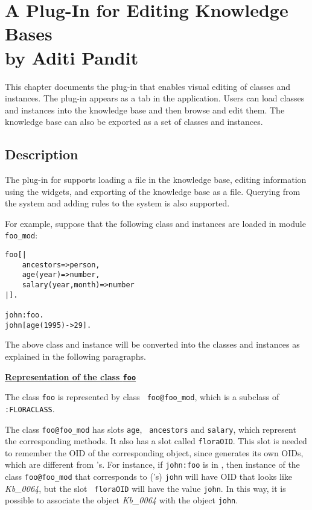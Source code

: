 

\chapter[A \Protege Plug-In for Editing  \FLSYSTEM Knowledge Bases]{A \Protege Plug-In for Editing  \FLSYSTEM Knowledge Bases\\
      {\Large by Aditi Pandit}}

    This chapter documents the \Protege plug-in that enables visual editing of
    \FLSYSTEM classes and instances. The plug-in appears as a tab in the \Protege
    application. Users can load \FLSYSTEM classes and
    instances into the \Protege knowledge base and then browse and edit them.
    The \Protege knowledge base can also be exported as a set of
    \fl classes and instances.

\section{Description}

The \Protege plug-in for \FLSYSTEM supports loading a \FLSYSTEM file in
the \Protege knowledge base, editing information using the \Protege
widgets, and exporting of the \Protege knowledge base as a \FLSYSTEM
file. Querying from the \Protege system and adding rules to the
\FLSYSTEM system is also supported.

For example, suppose that the following \FLSYSTEM class and instances
are loaded in module {\tt foo\_mod}:

\begin{verbatim}
foo[|
    ancestors=>person,
    age(year)=>number,
    salary(year,month)=>number
|].

john:foo.
john[age(1995)->29].
\end{verbatim}

The above \FLSYSTEM class and instance will be converted into the
\Protege classes and instances as explained in the following
paragraphs.

\underline{{\bf Representation of the class {\tt foo}}}

 The \fl class {\tt foo} is represented by \Protege class {\tt
foo@foo\_mod}, which is a subclass of {\tt :FLORACLASS}.

The \Protege class {\tt foo@foo\_mod} has slots {\tt age}, {\tt
  ancestors} and {\tt salary}, which represent the corresponding \fl
methods. It also has a slot called {\tt floraOID}. This slot is
needed to remember the OID of the corresponding \FLSYSTEM object, since
\Protege generates its own OIDs, which are different from \FLSYSTEM's.
For instance, if {\tt john:foo} is in \FLSYSTEM, then \Protege instance
of the \Protege class {\tt foo@foo\_mod} that corresponds to
(\FLSYSTEM's) {\tt john} will have \Protege OID that looks like
\emph{Kb\_0064}, but the slot {\tt
  floraOID} will have the value {\tt john}. In this way, it is possible
to associate the \Protege object \emph{Kb\_0064} with the \FLSYSTEM object
{\tt john}.

